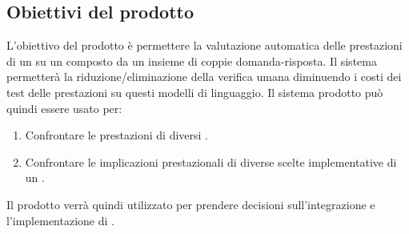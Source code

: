 \subsection{Obiettivi del prodotto}
L'obiettivo del prodotto è permettere la valutazione automatica delle prestazioni di un  su un  composto da un insieme di coppie domanda-risposta.
Il sistema permetterà la riduzione/eliminazione della verifica umana diminuendo i costi dei test delle prestazioni su questi modelli di linguaggio.
Il sistema prodotto può quindi essere usato per:
\begin{enumerate}
    \item Confrontare le prestazioni di diversi .
    \item Confrontare le implicazioni prestazionali di diverse scelte implementative di un .
\end{enumerate} 
Il prodotto verrà quindi utilizzato per prendere decisioni sull'integrazione e l'implementazione di .